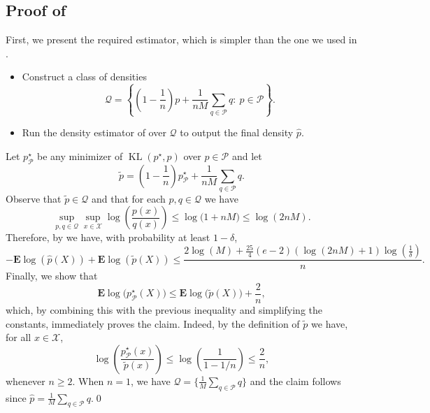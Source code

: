 \documentclass[11pt]{article}
\newcommand{\E}{{\mathbf E}}
\renewcommand{\le}{\leqslant}
\renewcommand{\ge}{\geqslant}
\newcommand{\M}{M}
\newcommand{\X}{\mathcal{X}}
\newcommand{\Qs}{\mathcal{Q}}
\newcommand{\kl}{\operatorname{KL}}
\theoremstyle{definition}
\theoremstyle{remark}
\begin{document}
\subsection[Proof of Proposition~\ref{prop:misspecmodelaggregation}]{Proof of }
First, we present the required estimator, which is simpler than the one we used in .
\begin{framed}
\begin{itemize}
\item Construct a class of densities 
\begin{equation}
\label{eq:newwprimeset}
\mathcal{Q}
=
\left\{
\left(1 - \frac{1}{n}\right)p
+ \frac{1}{nM}\sum_{q \in \mathcal{P}} q
:\ p \in \mathcal{P}
\right\}.
\end{equation}
\item Run the density estimator of  over $\mathcal{Q}$ to output the final density $\widehat{p}$.
\end{itemize}
\end{framed}

Let $p^\star_{\mathcal{P}}$ be any minimizer of $\kl(p^\star, p)$ over $p \in \mathcal{P}$ and let
\[
\widetilde{p}
=
\left(1 - \frac{1}{n}\right)p^\star_{\mathcal{P}}
+ \frac{1}{nM}\sum_{q \in \mathcal{P}} q.
\]
Observe that $\widetilde{p} \in \Qs$ and that for each $p, q \in \Qs$ we have
\[
\sup_{p,q \in \Qs}\sup_{x\in\X}\log\left(\frac{p(x)}{q(x)}\right)
\le \log\bigl(1 + nM\bigr)
\le \log(2nM).
\]
Therefore, by  we have, with probability at least $1 - \delta$,
\[
-\E\log(\widehat{p}(X)) + \E\log(\widetilde{p}(X))
\le
\frac{2\log(M) + \frac{25}{4}\left(e-2\right)\left(\log(2nM)+1\right)\log\left(\frac{1}{\delta}\right)}{n}.
\]
Finally, we show that
\[
\E\log\bigl(p^\star_{\mathcal{P}}(X)\bigr)
\le
\E\log\bigl(\widetilde{p}(X)\bigr)
+ \frac{2}{n},
\]
which, by combining this with the previous inequality and simplifying the constants, immediately proves the claim. Indeed, by the definition of $\widetilde{p}$ we have, for all $x\in\X$,
\begin{equation}
\label{eq:logratioofdens}
\log\left(\frac{p^\star_{\mathcal{P}}(x)}{\widetilde{p}(x)}\right)
\le \log\left(\frac{1}{1 - 1/n}\right)
\le \frac{2}{n},
\end{equation}
whenever $n \ge 2$. When $n = 1$, we have $\mathcal{Q} = \big\{\frac{1}{\M}\sum\limits_{q \in \mathcal P}q\big\}$ and the claim follows since $\widehat{p} = \frac{1}{\M}\sum\limits_{q \in \mathcal P}q$.\qed
\end{document}
